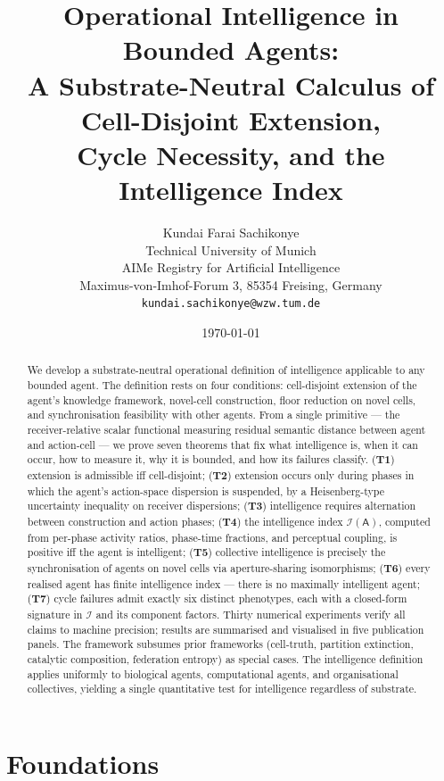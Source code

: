 \documentclass[11pt,twocolumn,a4paper]{article}
\title{\textbf{Operational Intelligence in Bounded Agents:\\
A Substrate-Neutral Calculus of Cell-Disjoint Extension,\\
Cycle Necessity, and the Intelligence Index}}
\author{Kundai Farai Sachikonye\\
Technical University of Munich\\
AIMe Registry for Artificial Intelligence\\
Maximus-von-Imhof-Forum 3, 85354 Freising, Germany\\
\texttt{kundai.sachikonye@wzw.tum.de}}
\date{\today}
\newcommand{\agent}{\mathsf{A}}
\newcommand{\Iindex}{\mathcal{I}}
\begin{document}
\maketitle

\begin{abstract}
We develop a substrate-neutral operational definition of intelligence applicable to any
bounded agent. The definition rests on four conditions: cell-disjoint extension of the
agent's knowledge framework, novel-cell construction, floor reduction on novel cells, and
synchronisation feasibility with other agents. From a single primitive
--- the receiver-relative scalar functional measuring residual semantic distance between
agent and action-cell --- we prove seven theorems that fix what intelligence is, when it
can occur, how to measure it, why it is bounded, and how its failures classify.
(\textbf{T1}) extension is admissible iff cell-disjoint;
(\textbf{T2}) extension occurs only during phases in which the agent's action-space
dispersion is suspended, by a Heisenberg-type uncertainty inequality on receiver
dispersions;
(\textbf{T3}) intelligence requires alternation between construction and action phases;
(\textbf{T4}) the intelligence index $\Iindex(\agent)$, computed from per-phase activity
ratios, phase-time fractions, and perceptual coupling, is positive iff the agent is
intelligent;
(\textbf{T5}) collective intelligence is precisely the synchronisation of agents on novel
cells via aperture-sharing isomorphisms;
(\textbf{T6}) every realised agent has finite intelligence index --- there is no
maximally intelligent agent;
(\textbf{T7}) cycle failures admit exactly six distinct phenotypes, each with a closed-form
signature in $\Iindex$ and its component factors. Thirty numerical experiments verify all
claims to machine precision; results are summarised and visualised in five publication
panels. The framework subsumes prior frameworks (cell-truth, partition extinction,
catalytic composition, federation entropy) as special cases. The intelligence definition
applies uniformly to biological agents, computational agents, and organisational
collectives, yielding a single quantitative test for intelligence regardless of substrate.
\end{abstract}

\tableofcontents
\clearpage

\part{Foundations}
\end{document}
